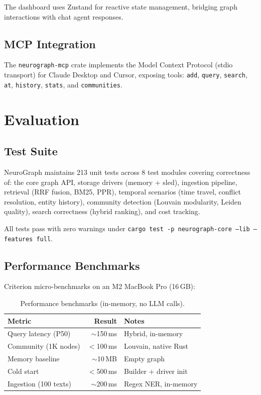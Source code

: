 \documentclass[11pt,twocolumn]{article}
\begin{document}
The dashboard uses Zustand for reactive state management, bridging graph interactions with chat agent responses.

\subsection{MCP Integration}

The \texttt{neurograph-mcp} crate implements the Model Context Protocol (stdio transport) for Claude Desktop and Cursor, exposing tools: \texttt{add}, \texttt{query}, \texttt{search}, \texttt{at}, \texttt{history}, \texttt{stats}, and \texttt{communities}.

\section{Evaluation}
\label{sec:eval}

\subsection{Test Suite}

NeuroGraph maintains 213 unit tests across 8 test modules covering correctness of: the core graph API, storage drivers (memory + sled), ingestion pipeline, retrieval (RRF fusion, BM25, PPR), temporal scenarios (time travel, conflict resolution, entity history), community detection (Louvain modularity, Leiden quality), search correctness (hybrid ranking), and cost tracking.

All tests pass with zero warnings under \texttt{cargo test -p neurograph-core --lib --features full}.

\subsection{Performance Benchmarks}

Criterion micro-benchmarks on an M2 MacBook Pro (16\,GB):

\begin{table}[h]
\centering\small
\begin{tabular}{@{}lrl@{}}
\toprule
\textbf{Metric} & \textbf{Result} & \textbf{Notes} \\
\midrule
Query latency (P50) & $\sim$150\,ms & Hybrid, in-memory \\
Community (1K nodes) & $<$100\,ms & Louvain, native Rust \\
Memory baseline & $\sim$10\,MB & Empty graph \\
Cold start & $<$500\,ms & Builder + driver init \\
Ingestion (100 texts) & $\sim$200\,ms & Regex NER, in-memory \\
\bottomrule
\end{tabular}
\caption{Performance benchmarks (in-memory, no LLM calls).}
\end{table}
\end{document}
